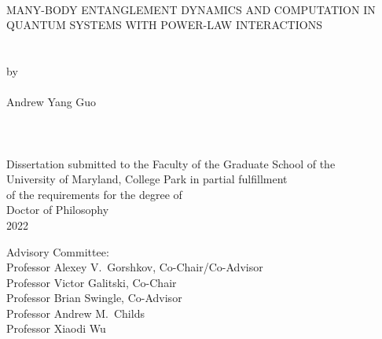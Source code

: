 \hbox{\ }
\vspace{1in}
\begin{center}

\large{{MANY-BODY ENTANGLEMENT DYNAMICS AND COMPUTATION IN QUANTUM SYSTEMS WITH POWER-LAW INTERACTIONS}}\\
\ \\
\ \\
\large{by} \\
\ \\
\large{Andrew Yang Guo}%
\ \\
\ \\
\ \\
\ \\
\normalsize
Dissertation submitted to the Faculty of the Graduate School of the \\
University of Maryland, College Park in partial fulfillment \\
of the requirements for the degree of \\
Doctor of Philosophy \\
2022
\end{center}

\vspace{7.5em}

\noindent Advisory Committee: \\
Professor Alexey V.\ Gorshkov, Co-Chair/Co-Advisor \\
Professor Victor Galitski, Co-Chair \\
Professor Brian Swingle, Co-Advisor\\
Professor Andrew M.\ Childs\\
Professor Xiaodi Wu
